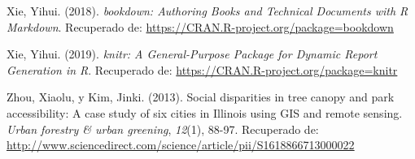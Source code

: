 \documentclass[12pt,a4paper,openany]{book}
\theoremstyle{definition}
\theoremstyle{definition}
\theoremstyle{definition}
\theoremstyle{remark}
\begin{document}
\hypertarget{ref-R-bookdown}{}
Xie, Yihui. (2018). \emph{bookdown: Authoring Books and Technical
Documents with R Markdown}. Recuperado de:
\url{https://CRAN.R-project.org/package=bookdown}

\hypertarget{ref-R-knitr}{}
Xie, Yihui. (2019). \emph{knitr: A General-Purpose Package for Dynamic
Report Generation in R}. Recuperado de:
\url{https://CRAN.R-project.org/package=knitr}

\hypertarget{ref-zhou_social_2013}{}
Zhou, Xiaolu, y Kim, Jinki. (2013). Social disparities in tree canopy
and park accessibility: A case study of six cities in Illinois using GIS
and remote sensing. \emph{Urban forestry \& urban greening},
\emph{12}(1), 88-97. Recuperado de:
\url{http://www.sciencedirect.com/science/article/pii/S1618866713000022}
\end{document}
